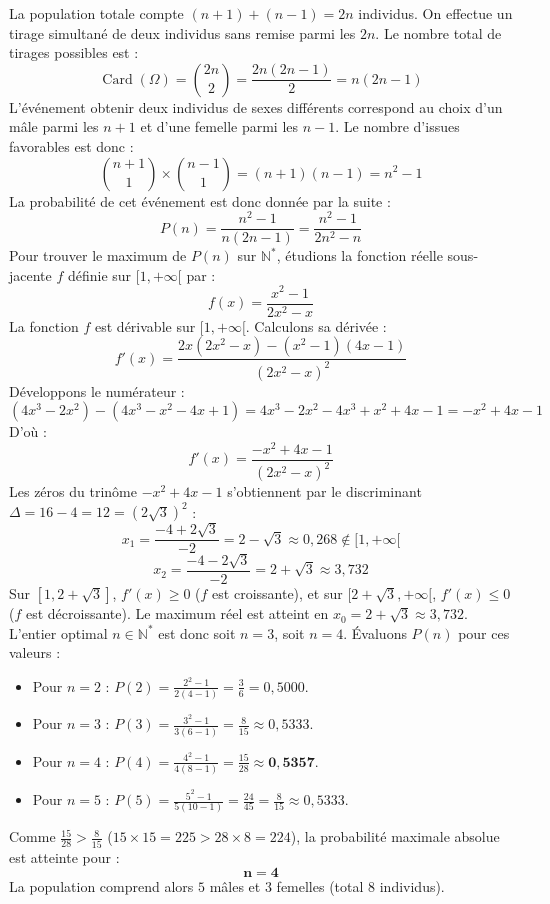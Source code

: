 \documentclass[11pt,a4paper]{article}
\newcommand{\N}{\mathbb{N}}
\begin{document}
\begin{correctionbox}
La population totale compte $(n+1) + (n-1) = 2n$ individus.
On effectue un tirage simultané de deux individus sans remise parmi les $2n$.
Le nombre total de tirages possibles est :
\[
\operatorname{Card}(\Omega) = \binom{2n}{2} = \frac{2n(2n-1)}{2} = n(2n-1)
\]
L'événement \og obtenir deux individus de sexes différents \fg{} correspond au choix d'un mâle parmi les $n+1$ et d'une femelle parmi les $n-1$.
Le nombre d'issues favorables est donc :
\[
\binom{n+1}{1} \times \binom{n-1}{1} = (n+1)(n-1) = n^2 - 1
\]
La probabilité de cet événement est donc donnée par la suite :
\[
P(n) = \frac{n^2 - 1}{n(2n-1)} = \frac{n^2 - 1}{2n^2 - n}
\]
Pour trouver le maximum de $P(n)$ sur $\N^*$, étudions la fonction réelle sous-jacente $f$ définie sur $[1, +\infty[$ par :
\[
f(x) = \frac{x^2 - 1}{2x^2 - x}
\]
La fonction $f$ est dérivable sur $[1, +\infty[$. Calculons sa dérivée :
\[
f'(x) = \frac{2x(2x^2 - x) - (x^2 - 1)(4x - 1)}{(2x^2 - x)^2}
\]
Développons le numérateur :
\[
(4x^3 - 2x^2) - (4x^3 - x^2 - 4x + 1) = 4x^3 - 2x^2 - 4x^3 + x^2 + 4x - 1 = -x^2 + 4x - 1
\]
D'où :
\[
f'(x) = \frac{-x^2 + 4x - 1}{(2x^2 - x)^2}
\]
Les zéros du trinôme $-x^2 + 4x - 1$ s'obtiennent par le discriminant $\Delta = 16 - 4 = 12 = (2\sqrt{3})^2$ :
\[
x_1 = \frac{-4 + 2\sqrt{3}}{-2} = 2 - \sqrt{3} \approx 0{,}268 \notin [1, +\infty[
\]
\[
x_2 = \frac{-4 - 2\sqrt{3}}{-2} = 2 + \sqrt{3} \approx 3{,}732
\]
Sur $[1, 2+\sqrt{3}]$, $f'(x) \ge 0$ ($f$ est croissante), et sur $[2+\sqrt{3}, +\infty[$, $f'(x) \le 0$ ($f$ est décroissante).
Le maximum réel est atteint en $x_0 = 2+\sqrt{3} \approx 3{,}732$.
L'entier optimal $n \in \N^*$ est donc soit $n = 3$, soit $n = 4$. Évaluons $P(n)$ pour ces valeurs :
\begin{itemize}[label=$\bullet$]
    \item Pour $n = 2$ : $P(2) = \frac{2^2 - 1}{2(4-1)} = \frac{3}{6} = 0{,}5000$.
    \item Pour $n = 3$ : $P(3) = \frac{3^2 - 1}{3(6-1)} = \frac{8}{15} \approx 0{,}5333$.
    \item Pour $n = 4$ : $P(4) = \frac{4^2 - 1}{4(8-1)} = \frac{15}{28} \approx \mathbf{0{,}5357}$.
    \item Pour $n = 5$ : $P(5) = \frac{5^2 - 1}{5(10-1)} = \frac{24}{45} = \frac{8}{15} \approx 0{,}5333$.
\end{itemize}
Comme $\frac{15}{28} > \frac{8}{15}$ ($15 \times 15 = 225 > 28 \times 8 = 224$), la probabilité maximale absolue est atteinte pour :
\[
\mathbf{n = 4}
\]
La population comprend alors $5$ mâles et $3$ femelles (total 8 individus).
\end{correctionbox}
\end{document}
